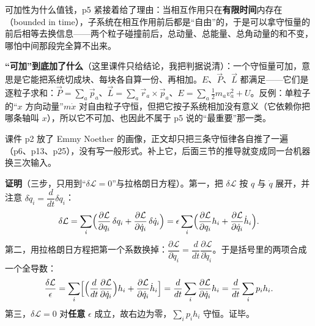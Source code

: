 \documentclass[11pt]{ctexart}
\begin{document}
可加性为什么值钱，p5 紧接着给了理由：当相互作用只在\textbf{有限时间}内存在（bounded in time），子系统在相互作用前后都是“自由”的，于是可以拿守恒量的前后相等去换信息——两个粒子碰撞前后，总动量、总能量、总角动量的和不变，哪怕中间那段完全算不出来。

\textbf{“可加”到底加了什么}（这里课件只给结论，我把判据说清）：一个守恒量可加，意思是它能把系统切成块、每块各自算一份、再相加。$E$、$\vec P$、$\vec L$ 都满足——它们是逐粒子求和：$\vec P=\sum_a\vec p_a$、$\vec L=\sum_a\vec r_a\times\vec p_a$、$E=\sum_a\frac12m_av_a^2+U$。反例：单粒子的“$x$ 方向动量”$m\dot x$ 对自由粒子守恒，但把它按子系统相加没有意义（它依赖你把哪条轴叫 $x$），所以它不可加、也因此不属于 p5 说的“最重要”那一类。


课件 p2 放了 Emmy Noether 的画像，正文却只把三条守恒律各自推了一遍（p6、p13、p25），没有写一般形式。补上它，后面三节的推导就变成同一台机器换三次输入。


\textbf{证明}（三步，只用到“$\delta\mathcal{L}=0$”与拉格朗日方程）。第一，把 $\delta\mathcal{L}$ 按 $q$ 与 $\dot q$ 展开，并注意 $\delta\dot q_i=\dfrac{d}{dt}\delta q_i$：
\[
\delta\mathcal{L}
=\sum_i\Bigl(\frac{\partial\mathcal{L}}{\partial q_i}\,\delta q_i+\frac{\partial\mathcal{L}}{\partial\dot q_i}\,\delta\dot q_i\Bigr)
=\epsilon\sum_i\Bigl(\frac{\partial\mathcal{L}}{\partial q_i}h_i+\frac{\partial\mathcal{L}}{\partial\dot q_i}\dot h_i\Bigr).
\]
第二，用拉格朗日方程把第一个系数换掉：$\dfrac{\partial\mathcal{L}}{\partial q_i}=\dfrac{d}{dt}\dfrac{\partial\mathcal{L}}{\partial\dot q_i}$。于是括号里的两项合成一个全导数：
\[
\frac{\delta\mathcal{L}}{\epsilon}
=\sum_i\Bigl[\Bigl(\frac{d}{dt}\frac{\partial\mathcal{L}}{\partial\dot q_i}\Bigr)h_i+\frac{\partial\mathcal{L}}{\partial\dot q_i}\dot h_i\Bigr]
=\frac{d}{dt}\sum_i\frac{\partial\mathcal{L}}{\partial\dot q_i}h_i
=\frac{d}{dt}\sum_i p_ih_i .
\]
第三，$\delta\mathcal{L}=0$ 对\textbf{任意} $\epsilon$ 成立，故右边为零，$\sum_i p_ih_i$ 守恒。证毕。

\end{document}
